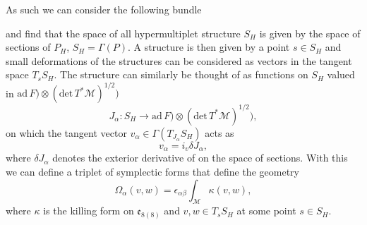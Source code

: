 As such we can consider the following bundle
\begin{center}
\end{center}
and find that the space of all hypermultiplet structure $S_{H}$ is given by the space of sections of $P_H$, $S_H = \Gamma(P)$. A structure is then given by a point $s\in S_H$ and small deformations of the structures can be considered as vectors in the tangent space $T_sS_H$. The structure can similarly be thought of as functions on $S_H$ valued in $\text{ad}\, F)\otimes (\text{det}\, T^*\mathcal{M})^{1/2})$
\begin{equation}
    J_\alpha: S_H \to \text{ad}\, F)\otimes (\text{det}\, T^*\mathcal{M})^{1/2}),
\end{equation}
on which the tangent vector $v_\alpha\in\Gamma(T_{J_\alpha}S_H)$ acts as 
\begin{equation}
    v_\alpha = i_v \delta J_\alpha,
\end{equation}
where $\delta J_\alpha$ denotes the exterior derivative of on the space of sections. With this we can define a triplet of symplectic forms that define the geometry 
\begin{equation}
    \Omega_\alpha(v,w) = \epsilon_{\alpha\beta}\int_\mathcal{M} \kappa(v,w),
\end{equation}
where $\kappa$ is the killing form on $\mathfrak{e}_{8(8)}$ and $v,w\in T_s S_H$ at some point $s\in S_H$. 

